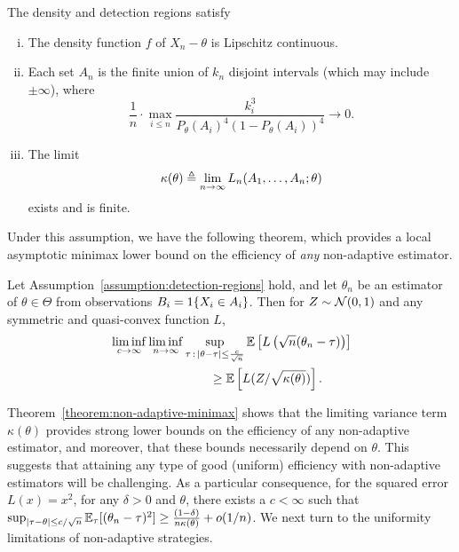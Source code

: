 \begin{assumption}
  \label{assumption:detection-regions}
  The density and detection regions satisfy
  \begin{enumerate}[(i)]
  \item \label{item:lipschitz-density}
    The density function $f$ of $X_n - \theta$ is Lipschitz continuous.
  \item \label{item:finite-intervals}
    Each set $A_n$ is the finite union of $k_n$ disjoint intervals
    (which may include $\pm \infty$), where
    \begin{equation*}
      \frac{1}{n} \cdot \max_{i \le n} \frac{k_i^3}{P_\theta(A_i)^4
        (1 - P_\theta(A_i))^4} \to 0.
    \end{equation*}
  \item \label{item:limit-variance}
    The limit
    \begin{equation}
      \label{eqn:LAN-limit}
      \kappa(\theta) \triangleq \lim_{n\to \infty} L_n(A_1,\ldots,A_n; \theta)
    \end{equation}
    exists and is finite.
  \end{enumerate}
\end{assumption}

Under this assumption, we have the following theorem, which provides
a local asymptotic minimax lower bound on the efficiency of
\emph{any} non-adaptive estimator.
\begin{theorem}
  \label{theorem:non-adaptive-minimax}
  Let Assumption~\ref{assumption:detection-regions} hold, and
  let ${\theta}_n$ be an estimator of $\theta \in \Theta$ from
  observations $B_i = 1\!\left\{X_i \in A_i\right\}$.
  Then for $Z \sim \mathcal{N}(0, 1)$ and any
  symmetric and quasi-convex function $L$,
  \begin{align*}
    & \liminf_{c \to \infty} \liminf_{n \to \infty}
    \sup_{\tau\,:\,|\theta-\tau| \leq \frac{c}{\sqrt{n} }}
    \mathbb{E} \left[ L\left( \sqrt{n}({\theta}_{n} - \tau) \right) \right] \\
    & \qquad \qquad \qquad \qquad \geq
    \mathbb{E}\left[ L (Z/\sqrt{\kappa(\theta)}) \right].
  \end{align*}
\end{theorem}

Theorem~\ref{theorem:non-adaptive-minimax} shows that the limiting variance
term $\kappa(\theta)$ provides strong lower bounds on the efficiency of any
non-adaptive estimator, and moreover, that these bounds necessarily depend
on $\theta$. This suggests that attaining any type of good (uniform)
efficiency with non-adaptive estimators will be challenging.  As a
particular consequence, for the squared error $L(x) = x^2$, for any $\delta
> 0$ and $\theta$, there exists a $c < \infty$ such that $\sup_{|\tau -
  \theta| \le c / \sqrt{n}} \mathbb{E}_\tau[(\theta_n - \tau)^2] \ge \frac{(1 -
  \delta)}{n \kappa(\theta)} + o(1/n)$.
We next turn to the uniformity limitations of non-adaptive strategies.

